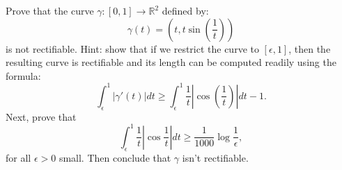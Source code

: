   \begin{exercise}
    Prove that the curve $\gamma : [0, 1] \to \mathbb{R}^2$ defined by:
    \begin{equation}
      \gamma(t) = (t, t\sin(\frac{1}{t}))
    \end{equation}
    is not rectifiable. Hint: show that if we restrict the curve to $[\epsilon, 1]$, then the resulting curve is rectifiable and its length can be computed readily using the formula:
    \begin{equation}
      \int_\epsilon^1 |\gamma'(t)|dt \geq \int_\epsilon^1 \frac{1}{t}|\cos(\frac{1}{t})|dt - 1.
    \end{equation}
    Next, prove that
    \begin{equation}
      \int_\epsilon^1 \frac{1}{t}|\cos\frac{1}{t}|dt \geq \frac{1}{1000} \log \frac{1}{\epsilon},
    \end{equation}
    for all $\epsilon > 0$ small. Then conclude that $\gamma$ isn't rectifiable.
  \end{exercise}
  \begin{solution}

  \end{solution}

